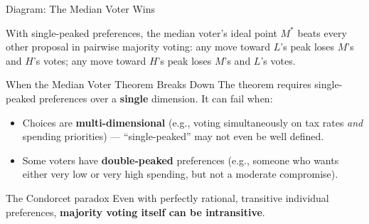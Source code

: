 \documentclass[11pt,aspectratio=169]{beamer}
\begin{document}
\begin{frame}{Diagram: The Median Voter Wins}
  \begin{center}
  \end{center}
  \footnotesize With single-peaked preferences, the median voter's ideal point $M^*$ beats every other proposal in pairwise majority voting: any move toward $L$'s peak loses $M$'s and $H$'s votes; any move toward $H$'s peak loses $M$'s and $L$'s votes.
\end{frame}

\begin{frame}{When the Median Voter Theorem Breaks Down}
  The theorem requires single-peaked preferences over a \textbf{single} dimension. It can fail when:
  \begin{itemize}
    \item Choices are \textbf{multi-dimensional} (e.g., voting simultaneously on tax rates \emph{and} spending priorities) --- ``single-peaked'' may not even be well defined.
    \item Some voters have \textbf{double-peaked} preferences (e.g., someone who wants either very low or very high spending, but not a moderate compromise).
  \end{itemize}
  \begin{block}{The Condorcet paradox}
    Even with perfectly rational, transitive individual preferences, \textbf{majority voting itself can be intransitive}.
  \end{block}
\end{frame}
\end{document}

